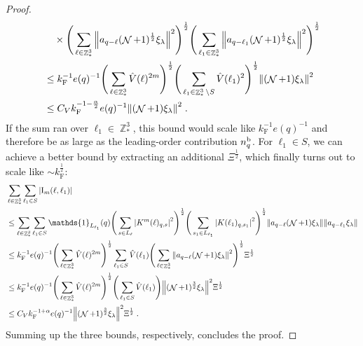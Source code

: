 \documentclass[12pt,a4paper]{article}
\numberwithin{equation}{section}
\newcommand{\1}{\mathbb{I}}
\renewcommand{\b}{\textnormal{b}}
\newcommand{\F}{\mathrm{F}}
\newcommand{\I}{\mathrm{I}}
\DeclareMathOperator{\Z}{\mathbb{Z}}
\DeclareMathOperator{\NN}{\mathcal{N}}
\newcommand{\half}{\frac{1}{2}}
\theoremstyle{plain}
\theoremstyle{definition}
\theoremstyle{remark}
\theoremstyle{plain}
\theoremstyle{definition}
\theoremstyle{remark}
\begin{document}
\begin{proof}
{\begin{align}
	& \quad \times 
		\Bigg( \sum_{\ell \in \Z^3_*} \norm{ a_{q-\ell} (\NN+1)^{\half} \xi_\lambda}^2 \Bigg)^{\half}
		\Bigg( \sum_{\ell_1 \in \Z^3_*} \norm{ a_{q-\ell_1} (\NN+1)^{\half} \xi_\lambda }^2 \Bigg)^{\half} \nonumber\\
	&\leq k_{\F}^{-1} e(q)^{-1}
		\Bigg( \sum_{\ell \in \Z^3_*} \hat{V}(\ell)^{2m} \Bigg)^{\half}
		\Bigg( \sum_{\ell_1 \in \Z^3_* \setminus S} \hat{V}(\ell_1)^2 \Bigg)^{\half} \norm{(\NN+1) \xi_\lambda}^2 \nonumber\\
	&\leq C_V k_{\F}^{-1-\frac{\alpha}{2}} e(q)^{-1}
		\norm{(\NN+1) \xi_\lambda}^2 \;. \label{eq:estEQ2113_Coulomb_1}
\end{align}
If the sum ran over $ \ell_1 \in \Z^3_* $, this bound would scale like $ k_{\F}^{-1} e(q)^{-1} $ and therefore be as large as the leading-order contribution $ n_q^{\b} $. For $ \ell_1 \in S $, we can achieve a better bound by extracting an additional $ \Xi^{\half} $, which finally turns out to scale like $ \sim k_{\F}^{\half} $:
\begin{align}
	&\sum_{\ell \in \Z^3_*} \sum_{\ell_1 \in S} |\I_m(\ell, \ell_1)| \nonumber\\
	&\leq \sum_{\ell \in \Z^3_*} \sum_{\ell_1 \in S} \mathds{1}_{L_{\ell_1}}(q) \Bigg(\sum\limits_{s \in L_{\ell}} \abs{K^m(\ell)_{q,s}}^2\Bigg)^\half
		\Bigg(\sum\limits_{s_1 \in L_{\ell_1}} \abs{K(\ell_1)_{q,s_1}}^2\Bigg)^\half
		\norm{ a_{q-\ell} (\NN+1) \xi_\lambda}
		\norm{ a_{q-\ell_1} \xi_\lambda }\nonumber\\
	&\leq k_{\F}^{-1} e(q)^{-1}
		\Bigg( \sum_{\ell \in \Z^3_*} \hat{V}(\ell)^{2m} \Bigg)^{\half}
		\sum_{\ell_1 \in S} \hat{V}(\ell_1)
		\Bigg( \sum_{\ell \in \Z^3_*} \norm{ a_{q-\ell} (\NN+1) \xi_\lambda}^2 \Bigg)^{\half}
		\Xi^{\half} \nonumber\\
	&\leq k_{\F}^{-1} e(q)^{-1}
		\Bigg( \sum_{\ell \in \Z^3_*} \hat{V}(\ell)^{2m} \Bigg)^{\half}
		\Bigg( \sum_{\ell_1 \in S} \hat{V}(\ell_1) \Bigg) \norm{(\NN+1)^{\frac 32} \xi_\lambda}^2 \Xi^{\half} \nonumber\\
	&\leq C_V k_{\F}^{-1 + \alpha} e(q)^{-1}
		\norm{(\NN+1)^{\frac 32} \xi_\lambda}^2 \Xi^{\half} \;. \label{eq:estEQ2113_Coulomb_2}
\end{align}
}
Summing up the three bounds, respectively, concludes the proof.
\end{proof}
\end{document}
